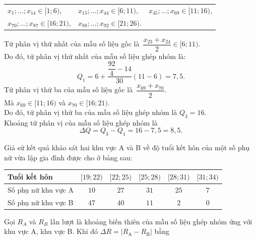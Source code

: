 \begin{bt}
{\begin{center}
\begin{tabular}{lll}
				$x_1;\ldots;x_{14}\in  [1; 6)$,&
				$x_{15};\ldots;x_{44}\in  [6; 11)$,&
				$x_{45};\ldots;x_{69}\in  [11; 16)$,\\
				$x_{70};\ldots;x_{87}\in  [16; 21)$,&
				$x_{88};\ldots;x_{92}\in  [21; 26)$.&
			\end{tabular}
		\end{center}
		Tứ phân vị thứ nhất của mẫu số liệu gốc là $\dfrac{x_{23}+x_{24}}{2}\in [6; 11)$. \\
		Do đó, tứ phân vị thứ nhất của mẫu số liệu ghép nhóm là:
		$$Q_1=6+\dfrac{\dfrac{92}{4}-14}{30}\left(11-6\right)=7{,}5.$$
		Tứ phân vị thứ ba của mẫu số liệu gốc là $\dfrac{x_{69}+x_{70}}{2}$.\\
		Mà $x_{69}\in [11; 16)$ và $x_{70}\in [16; 21)$. \\
		Do đó, tứ phân vị thứ ba của mẫu số liệu ghép nhóm là $Q_3 = 16$.\\
		Khoảng tứ phân vị của mẫu số liệu ghép nhóm là
		$$\Delta Q = Q_3 - Q_1 = 16 - 7{,}5 = 8{,}5.$$
	}
\end{bt}

\begin{bt}%

	Giả sử kết quả khảo sát hai khu vực A và B về độ tuổi kết hôn của một số phụ nữ vừa lập gia đình được cho ở bảng sau:
	\begin{center}
		\begin{tabular}{|l|c|c|c|c|c|}
			\hline
			Tuổi kết hôn & $[19; 22)$ & $[22; 25)$ & $[25; 28)$ & $[28; 31)$ & $[31; 34)$ \\
			\hline
			Số phụ nữ khu vực A & $10$ & $27$ & $31$ & $25$ & $7$ \\
			\hline
			Số phụ nữ khu vực B & $47$ & $40$ & $11$ & $2$ & $0$ \\
			\hline
		\end{tabular}
	\end{center}
Gọi $R_A$ và $R_B$ lần lượt là khoảng biến thiên của mẫu số liệu ghép nhóm ứng với khu vực A, khu vực B. Khi đó $\Delta R=|R_\text{A}-R_\text{B}|$ bằng
\end{bt}

